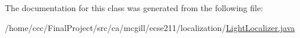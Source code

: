 The documentation for this class was generated from the following file\+:\begin{DoxyCompactItemize}
\item 
/home/ccc/\+Final\+Project/src/ca/mcgill/ecse211/localization/\hyperlink{_light_localizer_8java}{Light\+Localizer.\+java}\end{DoxyCompactItemize}
